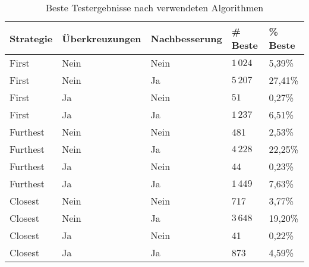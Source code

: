 \begin{center}
    \begin{table}
        \begin{tabular}{ l | l | l | l | l }
            \textbf{Strategie} & \textbf{Überkreuzungen} & \textbf{Nachbesserung} & \textbf{\# Beste} & \textbf{\% Beste} \\ \hline
            First & Nein & Nein & $1\,024$ & 5,39\% \\
            First & Nein & Ja & $5\,207$ & 27,41\% \\
            First & Ja & Nein & $51$ &  0,27\% \\
            First & Ja & Ja & $1\,237$ & 6,51\% \\ \hline
            Furthest & Nein & Nein &  481 & 2,53\% \\
            Furthest & Nein & Ja & $4\,228$ & 22,25\% \\
            Furthest & Ja & Nein & 44 & 0,23\% \\
            Furthest & Ja & Ja & $1\,449$ & 7,63\% \\ \hline
            Closest & Nein & Nein & 717 & 3,77\% \\
            Closest & Nein & Ja & $3\,648$ & 19,20\% \\
            Closest & Ja & Nein & 41 & 0,22\% \\
            Closest & Ja & Ja & 873 & 4,59\% \\ \hline
        \end{tabular}
        \caption{Beste Testergebnisse nach verwendeten Algorithmen}
        \label{tab:test-results1}
    \end{table}
\end{center}
